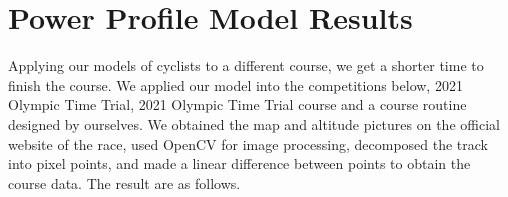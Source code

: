 \documentclass{mcmthesis}
\begin{document}
\section{Power Profile Model Results}
\par
Applying our models of cyclists to a different course, we get a shorter time to finish the course. We applied our model into the competitions below, 2021 Olympic Time Trial, 2021 Olympic Time Trial course and a course routine designed by ourselves. 
We obtained the map and altitude pictures on the official website of the race, used OpenCV for image processing, decomposed the track into pixel points, and made a linear difference between points to obtain the course data. The result are as follows.
\begin{figure}[H]
	\centering  %
	\subfigbottomskip=2pt %
	\subfigcapskip=-5pt %
		\\
\end{figure}
\end{document}
